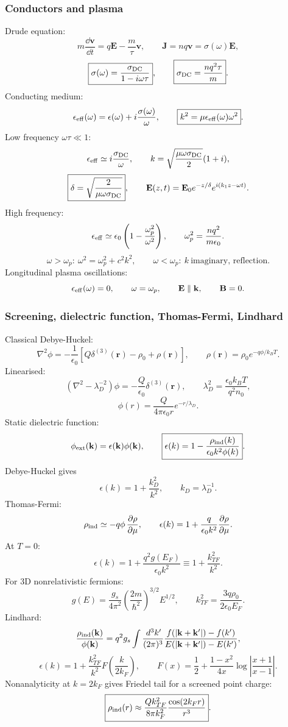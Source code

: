 \subsubsection*{Conductors and plasma}
Drude equation:
\[
m\frac{\dd\mathbf v}{\dd t}=q\mathbf E-\frac{m}{\tau}\mathbf v,\qquad
\mathbf J=nq\mathbf v=\sigma(\omega)\mathbf E,
\]
\[
\boxed{\sigma(\omega)=\frac{\sigma_{\rm DC}}{1-i\omega\tau}},\qquad
\boxed{\sigma_{\rm DC}=\frac{nq^2\tau}{m}}.
\]
Conducting medium:
\[
\epsilon_{\rm eff}(\omega)=\epsilon(\omega)+i\frac{\sigma(\omega)}{\omega},\qquad
\boxed{k^2=\mu\epsilon_{\rm eff}(\omega)\omega^2}.
\]
Low frequency $\omega\tau\ll1$:
\[
\epsilon_{\rm eff}\simeq i\frac{\sigma_{\rm DC}}{\omega},\qquad
k=\sqrt{\frac{\mu\omega\sigma_{\rm DC}}{2}}(1+i),
\]
\[
\boxed{\delta=\sqrt{\frac{2}{\mu\omega\sigma_{\rm DC}}}},\qquad
\mathbf E(z,t)=\mathbf E_0e^{-z/\delta}e^{i(k_1z-\omega t)}.
\]
High frequency:
\[
\epsilon_{\rm eff}\simeq\epsilon_0\left(1-\frac{\omega_p^2}{\omega^2}\right),\qquad
\omega_p^2=\frac{nq^2}{m\epsilon_0}.
\]
\[
\omega>\omega_p:\ \omega^2=\omega_p^2+c^2k^2,\qquad
\omega<\omega_p:\ k\ \text{imaginary, reflection}.
\]
Longitudinal plasma oscillations:
\[
\epsilon_{\rm eff}(\omega)=0,\qquad
\omega=\omega_p,\qquad \mathbf E\parallel\mathbf k,\qquad \mathbf B=0.
\]

\subsubsection*{Screening, dielectric function, Thomas-Fermi, Lindhard}
Classical Debye-Huckel:
\[
\nabla^2\phi=-\frac{1}{\epsilon_0}\left[Q\delta^{(3)}(\mathbf r)-\rho_0+\rho(\mathbf r)\right],
\qquad
\rho(\mathbf r)=\rho_0e^{-q\phi/k_BT}.
\]
Linearised:
\[
\left(\nabla^2-\lambda_D^{-2}\right)\phi=-\frac{Q}{\epsilon_0}\delta^{(3)}(\mathbf r),\qquad
\boxed{\lambda_D^2=\frac{\epsilon_0k_BT}{q^2n_0}},
\]
\[
\boxed{\phi(r)=\frac{Q}{4\pi\epsilon_0r}e^{-r/\lambda_D}}.
\]
Static dielectric function:
\[
\phi_{\rm ext}(\mathbf k)=\epsilon(\mathbf k)\phi(\mathbf k),\qquad
\boxed{\epsilon(k)=1-\frac{\rho_{\rm ind}(k)}{\epsilon_0k^2\phi(k)}}.
\]
Debye-Huckel gives
\[
\epsilon(k)=1+\frac{k_D^2}{k^2},\qquad k_D=\lambda_D^{-1}.
\]
Thomas-Fermi:
\[
\rho_{\rm ind}\simeq-q\phi\,\frac{\partial\rho}{\partial\mu},\qquad
\epsilon(k)=1+\frac{q}{\epsilon_0k^2}\frac{\partial\rho}{\partial\mu}.
\]
At $T=0$:
\[
\boxed{\epsilon(k)=1+\frac{q^2g(E_F)}{\epsilon_0k^2}}
\equiv1+\frac{k_{TF}^2}{k^2}.
\]
For 3D nonrelativistic fermions:
\[
g(E)=\frac{g_s}{4\pi^2}\left(\frac{2m}{\hbar^2}\right)^{3/2}E^{1/2},\qquad
k_{TF}^2=\frac{3q\rho_0}{2\epsilon_0E_F}.
\]
Lindhard:
\[
\frac{\rho_{\rm ind}(\mathbf k)}{\phi(\mathbf k)}
=q^2g_s\int\frac{\,d^3k'}{(2\pi)^3}
\frac{f(|\mathbf k+\mathbf k'|)-f(k')}
{E(|\mathbf k+\mathbf k'|)-E(k')},
\]
\[
\boxed{\epsilon(k)=1+\frac{k_{TF}^2}{k^2}F\!\left(\frac{k}{2k_F}\right)},\qquad
\boxed{F(x)=\frac12+\frac{1-x^2}{4x}\log\left|\frac{x+1}{x-1}\right|}.
\]
Nonanalyticity at $k=2k_F$ gives Friedel tail for a screened point charge:
\[
\boxed{\rho_{\rm ind}(r)\approx
\frac{Qk_{TF}^2}{8\pi k_F^2}\frac{\cos(2k_Fr)}{r^3}}.
\]

